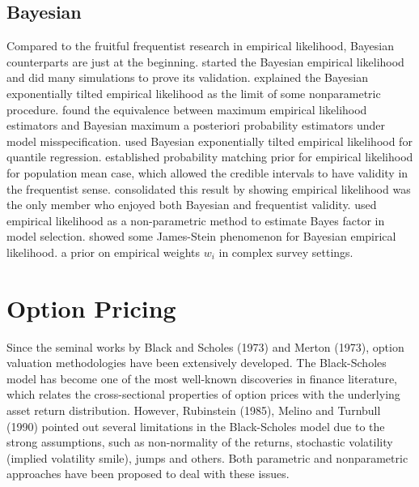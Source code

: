 \subsection{Bayesian }

Compared to the fruitful frequentist research in empirical likelihood,
Bayesian counterparts are just at the beginning. \citet{lazar2003bayesian}
started the Bayesian empirical likelihood and did many simulations
to prove its validation. \citet{schennach2005bayesian,schennach2007point}
explained the Bayesian exponentially tilted empirical likelihood as
the limit of some nonparametric procedure. \citet{grendar2009asymptotic}
found the equivalence between maximum empirical likelihood estimators
and Bayesian maximum a posteriori probability estimators under model
misspecification. \citet{lancaster2010bayesian} used Bayesian exponentially
tilted empirical likelihood for quantile regression. \citet{fang2005expected,fang2006empirical}
established probability matching prior for empirical likelihood for
population mean case, which allowed the credible intervals to have
validity in the frequentist sense. \citet{chang2008bayesian} consolidated
this result by showing empirical likelihood was the only member who
enjoyed both Bayesian and frequentist validity. \citet{vexler2013nonparametric}
used empirical likelihood as a non-parametric method to estimate Bayes
factor in model selection. \citet{vexler2014posterior} showed some
James-Stein phenomenon for Bayesian empirical likelihood. \citet{rao2010bayesian}
 a prior on empirical
weights $w_{i}$ in complex survey settings.

\begin{comment}
more papers in abc folder, pro and con of el
\end{comment}



\section{Option Pricing}

Since the seminal works by Black and Scholes (1973) and Merton (1973),
option valuation methodologies have been extensively developed. The
Black-Scholes model has become one of the most well-known discoveries
in finance literature, which relates the cross-sectional properties
of option prices with the underlying asset return distribution.
However, Rubinstein (1985), Melino and Turnbull (1990) pointed out
several limitations in the Black-Scholes model due to the strong assumptions,
such as non-normality of the returns, stochastic volatility (implied
volatility smile), jumps and others. Both parametric and nonparametric
approaches have been proposed to deal with these issues. 

